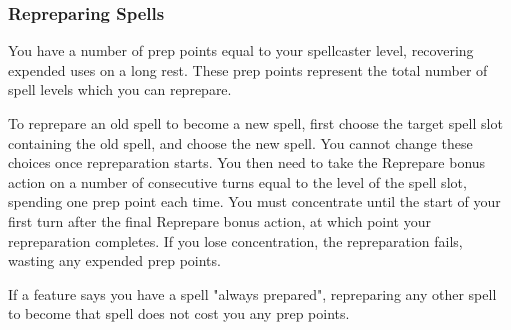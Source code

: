 \documentclass[letterpaper,twocolumn,openany,nodeprecatedcode,bg=print]{dndbook}
\begin{document}
\subsubsection{Repreparing Spells}
You have a number of prep points equal to your spellcaster level, recovering expended uses on a long rest.
These prep points represent the total number of spell levels which you can reprepare.

To reprepare an old spell to become a new spell, first choose the target spell slot containing the old spell, and choose the new spell. You cannot change these choices once repreparation starts.
You then need to take the Reprepare bonus action on a number of consecutive turns equal to the level of the spell slot, spending one prep point each time.
You must concentrate until the start of your first turn after the final Reprepare bonus action, at which point your repreparation completes.
If you lose concentration, the repreparation fails, wasting any expended prep points.

If a feature says you have a spell "always prepared", repreparing any other spell to become that spell does not cost you any prep points.
\end{document}
